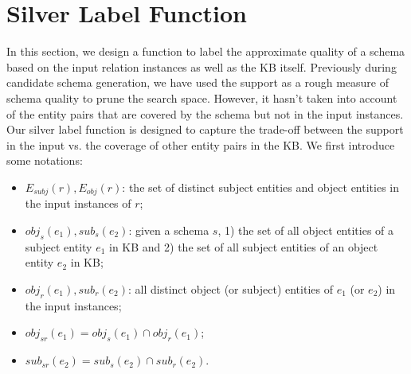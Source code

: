 \section{Silver Label Function}
\label{sec:label}

In this section, we design a function to label the approximate quality of
a schema based on the input relation instances as well as the KB itself.
Previously during candidate schema generation, we have used the support as
a rough measure of schema quality to prune the search space. 
However, it hasn't taken into account of the entity pairs that are 
covered by the schema but not in the input instances. 
Our silver label function is designed to capture the trade-off 
between the support in the input vs. the coverage of other entity pairs 
in the KB.
%
We first introduce some notations: 
\begin{itemize}
  \itemsep0em
  \item $E_{subj}(r), E_{obj}(r)$: the set of distinct subject entities and 
object entities in the input instances of $r$;
  \item $obj_s(e_1), sub_s(e_2)$: given a schema $s$, 1) the set of all object
entities of a subject entity $e_1$ in KB and 2) the set of all subject entities
of an object entity $e_2$ in KB; 
  \item $obj_r(e_1), sub_r(e_2)$: all distinct object (or subject) entities
of $e_1$ (or $e_2$) in the input instances;
  \item $obj_{sr}(e_1) = obj_s(e_1) \cap obj_r(e_1)$;
  \item $sub_{sr}(e_2) = sub_s(e_2) \cap sub_r(e_2)$.
\end{itemize}

